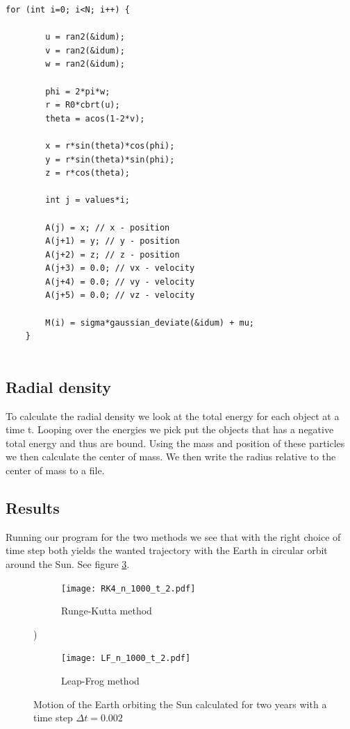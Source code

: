 \documentclass[a4paper,12pt, english]{article}
\begin{document}
\begin{lstlisting}[title={Initial conditions for the N-body system}]
    for (int i=0; i<N; i++) {

        u = ran2(&idum);
        v = ran2(&idum);
        w = ran2(&idum);

        phi = 2*pi*w;
        r = R0*cbrt(u);
        theta = acos(1-2*v);

        x = r*sin(theta)*cos(phi);
        y = r*sin(theta)*sin(phi);
        z = r*cos(theta);

        int j = values*i;

        A(j) = x; // x - position
        A(j+1) = y; // y - position
        A(j+2) = z; // z - position
        A(j+3) = 0.0; // vx - velocity
        A(j+4) = 0.0; // vy - velocity
        A(j+5) = 0.0; // vz - velocity

        M(i) = sigma*gaussian_deviate(&idum) + mu;
    }
  
\end{lstlisting}


\subsection*{Radial density}
To calculate the radial density we look at the total energy for each object at a time t. Looping over the energies we pick put the objects that has a negative total energy and thus are bound. Using the mass and position of these particles we then calculate the center of mass. We then write the radius relative to the center of mass to a file.


   
\subsection*{Results}

Running our program for the two methods we see that with the right choice of time step both yields the wanted trajectory with the Earth in circular orbit around the Sun. See figure \ref{dt_0.002}.

\begin{figure}
        \centering
        \begin{subfigure}[b]{0.6\textwidth}
                \texttt{[image: RK4\_n\_1000\_t\_2.pdf]}
                \caption{Runge-Kutta method}
                \label{fig:RK4_dt_0.002}
        \end{subfigure}%
 )
        \begin{subfigure}[b]{0.6\textwidth}
                \texttt{[image: LF\_n\_1000\_t\_2.pdf]}
                \caption{Leap-Frog method}
                \label{fig:LF_dt_0.002}
        \end{subfigure}
        \caption{Motion of the Earth orbiting the Sun calculated for two years with a time step $\Delta t = 0.002$}
\label{dt_0.002}
\end{figure}
\end{document}
